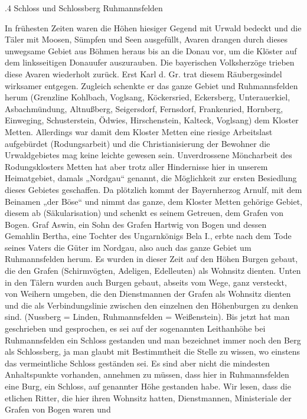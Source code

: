 \documentclass[12pt,a4paper]{book}
\begin{document}
.4 Schloss und Schlossberg Ruhmannsfelden

In frühesten Zeiten waren die Höhen hiesiger Gegend mit Urwald bedeckt und die
Täler mit Moosen, Sümpfen und Seen ausgefüllt, Avaren drangen durch dieses
unwegsame Gebiet aus Böhmen heraus bis an die Donau vor, um die Klöster auf dem
linksseitigen Donauufer auszurauben. Die bayerischen Volksherzöge trieben diese
Avaren wiederholt zurück. Erst Karl d. Gr. trat diesem Räubergesindel wirksamer
entgegen. Zugleich schenkte er das ganze Gebiet und Ruhmannsfelden herum
(Grenzline Kohlbach, Voglsang, Köckersried, Eckersberg, Unterauerkiel,
Asbachmündung, Altnußberg, Seigersdorf, Fernsdorf, Frankenried, Hornberg,
Einweging, Schusterstein, Ödwies, Hirschenstein, Kalteck, Voglsang) dem Kloster
Metten. Allerdings war damit dem Kloster Metten eine riesige Arbeitslast
aufgebürdet (Rodungsarbeit) und die Christianisierung der Bewohner die
Urwaldgebietes mag keine leichte gewesen sein. Unverdrossene Möncharbeit des
Rodungsklosters Metten hat aber trotz aller Hindernisse hier in unserem
Heimatgebiet, damals „Nordgau“ genannt, die Möglichkeit zur ersten Besiedlung
dieses Gebietes geschaffen. Da plötzlich kommt der Bayernherzog Arnulf, mit dem
Beinamen „der Böse“ und nimmt das ganze, dem Kloster Metten gehörige Gebiet,
diesem ab (Säkularisation) und schenkt es seinem Getreuen, dem Grafen von Bogen.
Graf Aswin, ein Sohn des Grafen Hartwig von Bogen und dessen Gemahlin Bertha,
eine Tochter des Ungarnkönigs Bela I., erbte nach dem Tode seines Vaters die
Güter im Nordgau, also auch das ganze Gebiet um Ruhmannsfelden herum. Es wurden
in dieser Zeit auf den Höhen Burgen gebaut, die den Grafen (Schirmvögten,
Adeligen, Edelleuten) als Wohnsitz dienten. Unten in den Tälern wurden auch
Burgen gebaut, abseits vom Wege, ganz versteckt, von Weihern umgeben, die den
Dienstmannen der Grafen als Wohnsitz dienten und die als Verbindungslinie
zwischen den einzelnen den Höhenburgen zu denken sind. (Nussberg = Linden,
Ruhmannsfelden = Weißenstein). Bis jetzt hat man geschrieben und gesprochen, es
sei auf der sogenannten Leithanhöhe bei Ruhmannsfelden ein Schloss gestanden und
man bezeichnet immer noch den Berg als Schlossberg, ja man glaubt mit
Bestimmtheit die Stelle zu wissen, wo einstens das vermeintliche Schloss
geständen sei. Es sind aber nicht die mindesten Anhaltspunkte vorhanden,
annehmen zu müssen, dass hier in Ruhmannsfelden eine Burg, ein Schloss, auf
genannter Höhe gestanden habe. Wir lesen, dass die etlichen Ritter, die hier
ihren Wohnsitz hatten, Dienstmannen, Ministeriale der Grafen von Bogen waren und
\end{document}
